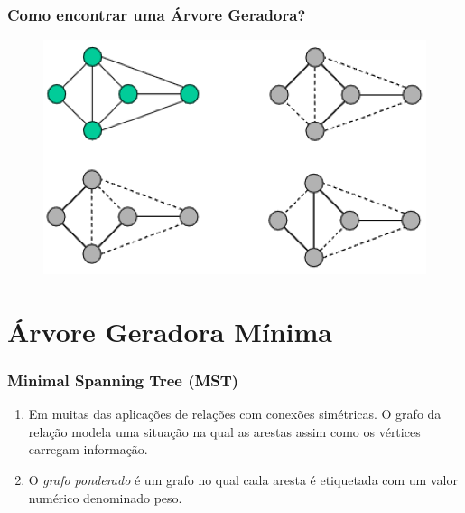 \documentclass[hyperref={pdfpagelabels=false}]{beamer}
\begin{document}
\begin{frame}
\frametitle{Como encontrar uma Árvore Geradora?} 

\begin{figure}[!h]
	\centering
	\includegraphics[scale=0.4]{06}
	\label{06}
\end{figure}

\end{frame}

\section{Árvore Geradora Mínima}

\begin{frame}
\frametitle{Minimal Spanning Tree (MST)}

\begin{enumerate}
	\item Em muitas das aplicações de relações com conexões simétricas. O grafo da relação modela uma situação na qual as arestas assim como os vértices carregam informação.
	\item O \emph{grafo ponderado} é um grafo no qual cada aresta é etiquetada com um valor numérico denominado peso.
\end{enumerate}
\end{frame}
\end{document}
